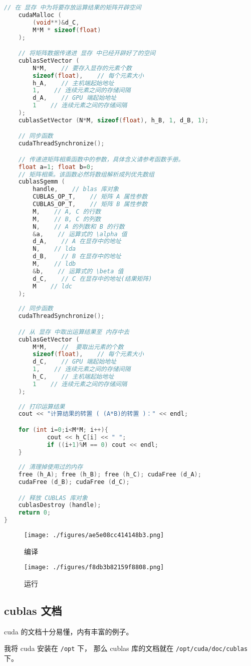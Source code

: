 \begin{lstlisting}[language=cpp, caption=cublas\_demo.cu]
    // 在 显存 中为将要存放运算结果的矩阵开辟空间
    cudaMalloc (
        (void**)&d_C,
        M*M * sizeof(float)    
    );

    // 将矩阵数据传递进 显存 中已经开辟好了的空间
    cublasSetVector (
        N*M,    // 要存入显存的元素个数
        sizeof(float),    // 每个元素大小
        h_A,    // 主机端起始地址
        1,    // 连续元素之间的存储间隔
        d_A,    // GPU 端起始地址
        1    // 连续元素之间的存储间隔
    );
    cublasSetVector (N*M, sizeof(float), h_B, 1, d_B, 1);

    // 同步函数
    cudaThreadSynchronize();

    // 传递进矩阵相乘函数中的参数，具体含义请参考函数手册。
    float a=1; float b=0;
    // 矩阵相乘。该函数必然将数组解析成列优先数组
    cublasSgemm (
        handle,    // blas 库对象 
        CUBLAS_OP_T,    // 矩阵 A 属性参数
        CUBLAS_OP_T,    // 矩阵 B 属性参数
        M,    // A, C 的行数 
        M,    // B, C 的列数
        N,    // A 的列数和 B 的行数
        &a,    // 运算式的 \alpha 值
        d_A,    // A 在显存中的地址
        N,    // lda
        d_B,    // B 在显存中的地址
        M,    // ldb
        &b,    // 运算式的 \beta 值
        d_C,    // C 在显存中的地址(结果矩阵)
        M    // ldc
    );
    
    // 同步函数
    cudaThreadSynchronize();

    // 从 显存 中取出运算结果至 内存中去
    cublasGetVector (
        M*M,    //  要取出元素的个数
        sizeof(float),    // 每个元素大小
        d_C,    // GPU 端起始地址
        1,    // 连续元素之间的存储间隔
        h_C,    // 主机端起始地址
        1    // 连续元素之间的存储间隔
    );
    
    // 打印运算结果
    cout << "计算结果的转置 ( (A*B)的转置 )：" << endl;

    for (int i=0;i<M*M; i++){
            cout << h_C[i] << " ";
            if ((i+1)%M == 0) cout << endl;
    }
    
    // 清理掉使用过的内存
    free (h_A); free (h_B); free (h_C); cudaFree (d_A);
    cudaFree (d_B); cudaFree (d_C);

    // 释放 CUBLAS 库对象
    cublasDestroy (handle);
    return 0;
}
\end{lstlisting}

\begin{figure}[h]
\centering
\texttt{[image: ./figures/ae5e08cc414148b3.png]}
\caption{编译} \label{fig_cublas_1}
\end{figure}

\begin{figure}[h]
\centering
\texttt{[image: ./figures/f8db3b82159f8808.png]}
\caption{运行} \label{fig_cublas_2}
\end{figure}

\subsection{cublas 文档}%

cuda 的文档十分易懂，内有丰富的例子。

我将 cuda 安装在 \verb|/opt| 下， 那么 cublas 库的文档就在 \verb|/opt/cuda/doc/cublas| 下。

